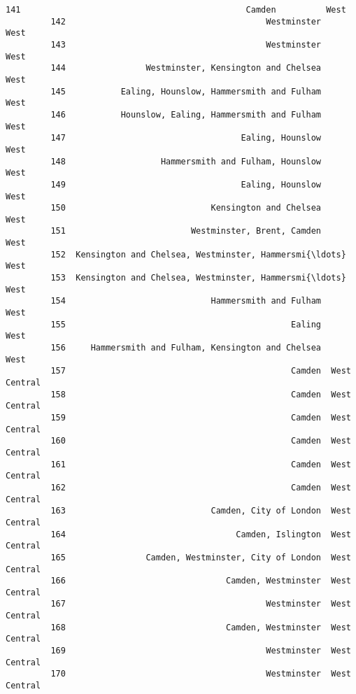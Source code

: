 \documentclass[11pt]{article}
\begin{document}
\begin{Verbatim}[commandchars=\\\{\}]
         141                                             Camden          West   
         142                                        Westminster          West   
         143                                        Westminster          West   
         144                Westminster, Kensington and Chelsea          West   
         145           Ealing, Hounslow, Hammersmith and Fulham          West   
         146           Hounslow, Ealing, Hammersmith and Fulham          West   
         147                                   Ealing, Hounslow          West   
         148                   Hammersmith and Fulham, Hounslow          West   
         149                                   Ealing, Hounslow          West   
         150                             Kensington and Chelsea          West   
         151                         Westminster, Brent, Camden          West   
         152  Kensington and Chelsea, Westminster, Hammersmi{\ldots}          West   
         153  Kensington and Chelsea, Westminster, Hammersmi{\ldots}          West   
         154                             Hammersmith and Fulham          West   
         155                                             Ealing          West   
         156     Hammersmith and Fulham, Kensington and Chelsea          West   
         157                                             Camden  West Central   
         158                                             Camden  West Central   
         159                                             Camden  West Central   
         160                                             Camden  West Central   
         161                                             Camden  West Central   
         162                                             Camden  West Central   
         163                             Camden, City of London  West Central   
         164                                  Camden, Islington  West Central   
         165                Camden, Westminster, City of London  West Central   
         166                                Camden, Westminster  West Central   
         167                                        Westminster  West Central   
         168                                Camden, Westminster  West Central   
         169                                        Westminster  West Central   
         170                                        Westminster  West Central   
         

\end{Verbatim}
\end{document}
